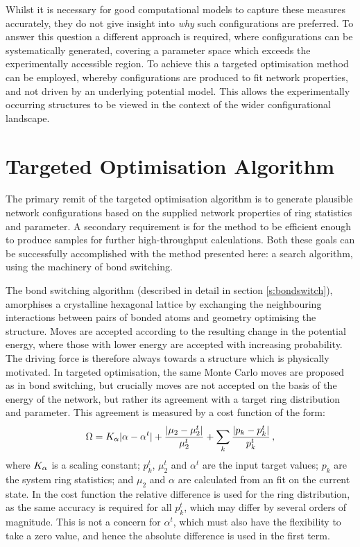 Whilst it is necessary for good computational models to capture these measures accurately, they do not give insight into \textit{why} such configurations are preferred. 
To answer this question a different approach is required, where configurations can be systematically generated, covering a parameter space which exceeds the experimentally accessible region.
To achieve this a targeted optimisation method can be employed, whereby configurations are produced to fit network properties, and not driven by an underlying potential model.
This allows the experimentally occurring structures to be viewed in the context of the wider configurational landscape.

\section{Targeted Optimisation Algorithm}

The primary remit of the targeted optimisation algorithm is to generate plausible network configurations based on the supplied network properties of ring statistics and \aw{} parameter.
A secondary requirement is for the method to be efficient enough to produce samples for further high\--throughput calculations.
Both these goals can be successfully accomplished with the method presented here: a \mc{} search algorithm, using the machinery of bond switching.

The bond switching algorithm (described in detail in section \ref{s:bondswitch}), amorphises a crystalline hexagonal lattice by exchanging the neighbouring interactions between pairs of bonded atoms and geometry optimising the structure.
Moves are accepted according to the resulting change in the potential energy, where those with lower energy are accepted with increasing probability.
The driving force is therefore always towards a structure which is physically motivated.
In targeted optimisation, the same Monte Carlo moves are proposed as in bond switching, but crucially moves are not accepted on the basis of the energy of the network, but rather its agreement with a target ring distribution and \aw{} parameter.
This agreement is measured by a cost function of the form:
\begin{equation}
	\label{eq:costfunc}
	\Omega=K_\alpha\lvert\alpha-\alpha^t\rvert+\frac{\lvert\mu_2-\mu_2^t\rvert}{\mu_2^t}+\sum\limits_k\frac{\lvert p_k-p_k^t\rvert}{p_k^t}\,,
\end{equation} 
where $K_\alpha$ is a scaling constant; $p_k^t$, $\mu_2^t$ and $\alpha^t$ are the input target values; $p_k$ are the system ring statistics; and $\mu_2$ and $\alpha$ are calculated from an \aw{} fit on the current state.
In the cost function the relative difference is used for the ring distribution, as the same accuracy is required for all $p_k^t$, which may differ by several orders of magnitude. 
This is not a concern for $\alpha^t$, which must also have the flexibility to take a zero value, and hence the absolute difference is used in the first term. 

